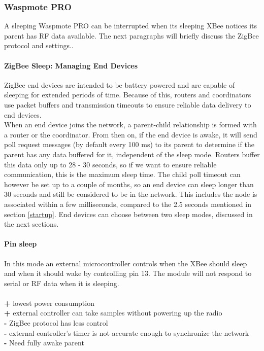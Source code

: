 \subsubsection{Waspmote PRO} %
A sleeping Waspmote PRO can be interrupted when its sleeping XBee notices its parent has RF data available. The next paragraphs will briefly discuss the ZigBee protocol and settings.. 
\paragraph{ZigBee Sleep: Managing End Devices}
ZigBee end devices are intended to be battery powered and are capable of sleeping for extended periods of time. Because of this, routers and coordinators use packet buffers and transmission timeouts to ensure reliable data delivery to end devices.\\
When an end device joins the network, a parent-child relationship is formed with a router or the coordinator. From then on, if the end device is awake, it will send poll request messages (by default every 100 ms) to its parent to determine if the parent has any data buffered for it, independent of the sleep mode. Routers buffer this data only up to 28 - 30 seconds, so if we want to ensure reliable communication, this is the maximum sleep time. The child poll timeout can however be set up to a couple of months, so an end device can sleep longer than 30 seconds and still be considered to be in the network. This includes the node is associated within a few milliseconds, compared to the 2.5 seconds mentioned in section \ref{startup}. End devices can choose between two sleep modes, discussed in the next sections. 
\paragraph{Pin sleep}
In this mode an external microcontroller controls when the XBee should sleep and when it should wake by controlling pin 13. The module will not respond to serial or RF data when it is sleeping.\\\\
\textbf{+} lowest power consumption\\
\textbf{+} external controller can take samples without powering up the radio\\
\textbf{-} ZigBee protocol has less control\\
\textbf{-} external controller's timer is not accurate enough to synchronize the network\\
\textbf{-} Need fully awake parent\\
